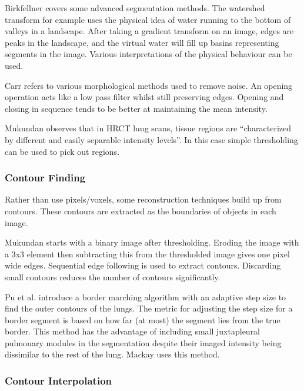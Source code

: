 \documentclass[11p, titlepage]{article}
\begin{document}
Birkfellner \cite{birkfellner2016applied} covers some advanced segmentation methods. The watershed transform for example uses the physical idea of water running to the bottom of valleys in a landscape. After taking a gradient transform on an image, edges are peaks in the landscape, and the virtual water will fill up basins representing segments in the image. Various interpretations of the physical behaviour can be used.

Carr \cite{carr1996surface} refers to various morphological methods used to remove noise. An opening operation acts like a low pass filter whilst still preserving edges. Opening and closing in sequence tends to be better at maintaining the mean intensity.

Mukundan \cite{mukundan2016reconstruction} observes that in HRCT lung scans, tissue regions are ``characterized by different and easily separable intensity levels''. In this case simple thresholding can be used to pick out regions. 

\subsubsection{Contour Finding}

Rather than use pixels/voxels, some reconstruction techniques build up from contours. These contours are extracted as the boundaries of objects in each image.

Mukundan \cite{mukundan2016reconstruction} starts with a binary image after thresholding. Eroding the image with a 3x3 element then subtracting this from the thresholded image gives one pixel wide edges. Sequential edge following is used to extract contours. Discarding small contours reduces the number of contours significantly.

Pu et al. \cite{pu2008adaptive} introduce a border marching algorithm with an adaptive step size to find the outer contours of the lungs. The metric for adjusting the step size for a border segment is based on how far (at most) the segment lies from the true border. This method has the advantage of including small juxtapleural pulmonary modules in the segmentation despite their imaged intensity being dissimilar to the rest of the lung. Mackay \cite{mackay2019robust} uses this method.

\subsubsection{Contour Interpolation}
\end{document}
